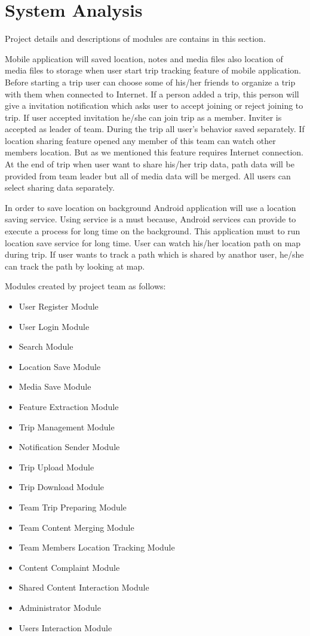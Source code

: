 \chapter{System Analysis}
Project details and descriptions of modules are contains in this section.

Mobile application will saved location, notes and media files also location of media files to storage when user start trip tracking feature of mobile application. Before starting a trip user can choose some of his/her friends to organize a trip with them when connected to Internet. If a person added a trip, this person will give a invitation notification which asks user to accept joining or reject joining to trip. If user accepted invitation he/she can join trip as a member. Inviter is accepted as leader of team. During the trip all user's behavior saved separately. If location sharing feature opened any member of this team can watch other members location. But as we mentioned this feature requires Internet connection. At the end of trip when user want to share his/her trip data, path data will be provided from team leader but all of media data will be merged. All users can select sharing data separately.

In order to save location on background Android application will use a location saving service. Using service is a must because, Android services can provide to execute a process for long time on the background. This application must to run location save service for long time. User can watch his/her location path on map during trip. If user wants to track a path which is shared by anathor user, he/she can track the path by looking at map.

Modules created by project team as follows:
\begin{itemize}
    \item User Register Module
    \item User Login Module
    \item Search Module
    \item Location Save Module
    \item Media Save Module
    \item Feature Extraction Module
    \item Trip Management Module
    \item Notification Sender Module
    \item Trip Upload Module
    \item Trip Download Module
	\item Team Trip Preparing Module 
    \item Team Content Merging Module
    \item Team Members Location Tracking Module
    \item Content Complaint Module 
    \item Shared Content Interaction Module 
    \item Administrator Module
	\item Users Interaction Module 
	    
        
        	        
\end{itemize}

